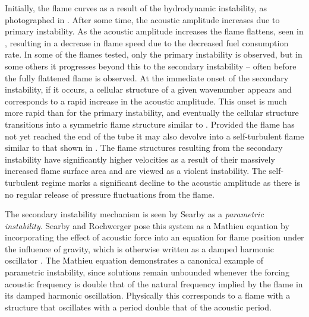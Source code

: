 Initially, the flame curves as a result of the hydrodynamic instability, as photographed in . After some time, the acoustic amplitude increases due to primary instability. As the acoustic amplitude increases the flame flattens, seen in , resulting in a decrease in flame speed due to the decreased fuel consumption rate. In some of the flames tested, only the primary instability is observed, but in some others it progresses beyond this to the secondary instability -- often before the fully flattened flame is observed. At the immediate onset of the secondary instability, if it occurs, a cellular structure of a given wavenumber appears and corresponds to a rapid increase in the acoustic amplitude. This onset is much more rapid than for the primary instability, and eventually the cellular structure transitions into a symmetric flame structure similar to . Provided the flame has not yet reached the end of the tube it may also devolve into a self-turbulent flame similar to that shown in . The flame structures resulting from the secondary instability have significantly higher velocities as a result of their massively increased flame surface area and are viewed as a violent instability. The self-turbulent regime marks a significant decline to the acoustic amplitude as there is no regular release of pressure fluctuations from the flame.

The secondary instability mechanism is seen by Searby \cite{searby1992AcousticInstabilityPremixed} as a \emph{parametric instability}. Searby and Rochwerger \cite{searby1991ParametricAcousticInstability} pose this system as a Mathieu equation by incorporating the effect of acoustic force into an equation for flame position under the influence of gravity, which is otherwise written as a damped harmonic oscillator \cite{searby1986WeaklyTurbulentWrinkled}. The Mathieu equation demonstrates a canonical example of parametric instability, since solutions remain unbounded whenever the forcing acoustic frequency is double that of the natural frequency implied by the flame in its damped harmonic oscillation. Physically this corresponds to a flame with a structure that oscillates with a period double that of the acoustic period.

